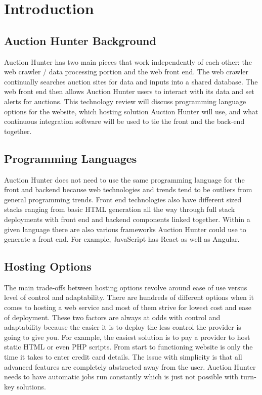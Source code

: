 \documentclass[onecolumn, draftclsnofoot,10pt, compsoc]{IEEEtran}
\begin{document}
\section{Introduction}
\subsection{Auction Hunter Background}
Auction Hunter has two main pieces that work independently of each other: the web crawler / data processing portion and the web front end. The web crawler continually searches auction sites for data and inputs into a shared database. The web front end then allows Auction Hunter users to interact with its data and set alerts for auctions. This technology review will discuss programming language options for the website, which hosting solution Auction Hunter will use, and what continuous integration software will be used to tie the front and the back-end together.

\subsection{Programming Languages}
Auction Hunter does not need to use the same programming language for the front and backend because web technologies and trends tend to be outliers from general programming trends. Front end technologies also have different sized stacks ranging from basic HTML generation all the way through full stack deployments with front end and backend components linked together. Within a given language there are also various frameworks Auction Hunter could use to generate a front end. For example, JavaScript has React as well as Angular. 

\subsection{Hosting Options}
The main trade-offs between hosting options revolve around ease of use versus level of control and adaptability. There are hundreds of different options when it comes to hosting a web service and most of them strive for lowest cost and ease of deployment. These two factors are always at odds with control and adaptability because the easier it is to deploy the less control the provider is going to give you. For example, the easiest solution is to pay a provider to host static HTML or even PHP scripts. From start to functioning website is only the time it takes to enter credit card details. The issue with simplicity is that all advanced features are completely abstracted away from the user. Auction Hunter needs to have automatic jobs run constantly which is just not possible with turn-key solutions. 
\end{document}
